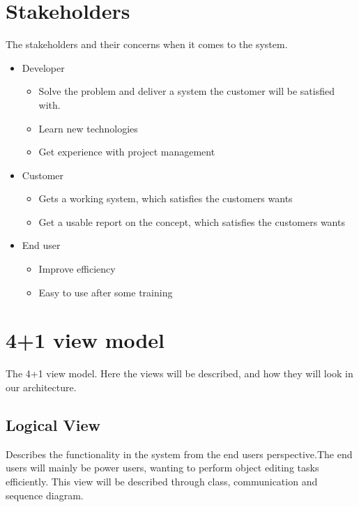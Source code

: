 \section{Stakeholders}
The stakeholders and their concerns when it comes to the system.

\begin{itemize}
    \item Developer
    \begin{itemize}
        \item Solve the problem and deliver a system the customer will be satisfied with.
        \item Learn new technologies
        \item Get experience with project management
        \end{itemize}
    \item Customer
    \begin{itemize}
        \item Gets a working system, which satisfies the customers wants
        \item Get a usable report on the concept, which satisfies the customers wants
    \end{itemize}
    \item End user
    \begin{itemize}
        \item Improve efficiency
        \item Easy to use after some training
    \end{itemize}
\end{itemize}



\section{4+1 view model}
The 4+1 view model\cite{41viewmodel}. Here the views will be described, and how they will look in our architecture. 

\subsection{Logical View}
Describes the functionality in the system from the end users perspective.The end users will mainly be power users, wanting to perform object editing tasks efficiently. This view will be described through class, communication and sequence diagram.

